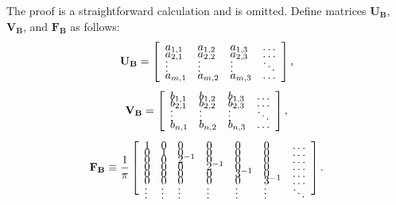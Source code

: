 \documentclass[12pt,onecolumn,draftcls]{IEEEtran}
\begin{document}
The proof is a straightforward calculation and is omitted.
Define matrices $\mathbf{U_B}$, $\mathbf{V_B}$, and $\mathbf{F_B}$ as follows:
\begin{equation}
\mathbf{U_B}=
\left[
\begin{array}{llll}
a_{1,1} & a_{1,2} & a_{1,3} & \ldots \vspace{-0.2cm}\\
a_{2,1} & a_{2,2} & a_{2,3} & \ldots \vspace{-0.2cm}\\
\vdots & \vdots & \vdots & \ddots \vspace{-0.2cm}\\
a_{m,1} & a_{m,2} & a_{m,3} & \ldots
\end{array}
\right],
\end{equation}
\begin{equation}
\mathbf{V_B}=
\left[
\begin{array}{llll}
b_{1,1} & b_{1,2} & b_{1,3} & \ldots \vspace{-0.2cm}\\
b_{2,1} & b_{2,2} & b_{2,3} & \ldots \vspace{-0.2cm}\\
\vdots & \vdots & \vdots & \ddots \vspace{-0.2cm}\\
b_{n,1} & b_{n,2} & b_{n,3} & \ldots 
\end{array}
\right],
\end{equation}
\begin{equation}
\mathbf{F_B} \equiv
\frac{1}{\pi}\left[
\begin{array}{lllllll}
1 & 0 & 0 & 0 & 0 & 0 & \ldots \vspace{-0.2cm}\\
0 & 1 & 0 & 0 & 0 & 0 & \ldots \vspace{-0.2cm}\\
0 & 0 & 2^{-1} & 0 & 0 & 0 &  \ldots \vspace{-0.2cm}\\
0 & 0 & 0 & 2^{-1} & 0 & 0 &  \ldots \vspace{-0.2cm}\\
0 & 0 & 0 & 0 & 3^{-1} & 0 & \ldots \vspace{-0.2cm}\\
0 & 0 & 0 & 0 & 0 & 3^{-1} & \ldots \vspace{-0.2cm}\\
\vdots & \vdots & \vdots & \vdots & \vdots & \vdots & \ddots \vspace{-0.2cm}\\
\end{array}
\right].
\label{eq:FB}
\end{equation}
\end{document}
